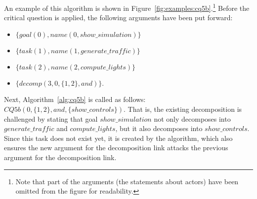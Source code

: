An example of this algorithm is shown in Figure~\ref{fig:examples:cq5b}.\footnote{Note that part of the arguments (the statements about actors) have been omitted from the figure for readability.} Before the critical question is applied, the following arguments have been put forward:
\begin{itemize}
\item $\{goal(0),name(0,show\_simulation)\}$
\item $\{task(1),name(1,generate\_traffic)\}$
\item $\{task(2),name(2,compute\_lights)\}$
\item $\{decomp(3,0,\{1,2\},and)\}$.
\end{itemize}

Next, Algorithm~\ref{alg:cq5b} is called as follows: $CQ5b(0,\{1,2\},and,\{show\_controls\})$. That is, the existing decomposition is challenged by stating that goal $show\_simulation$ not only decomposes into $generate\_traffic$ and $compute\_lights$, but it also decomposes into $show\_controls$. Since this task does not exist yet, it is created by the algorithm, which also ensures the new argument for the decomposition link attacks the previous argument for the decomposition link.

\begin{figure*}[ht!]
\centering
\caption{Example of applying critical question CQ5b (Algorithm~\ref{alg:cq5b})}
\label{fig:examples:cq5b}
\end{figure*}

